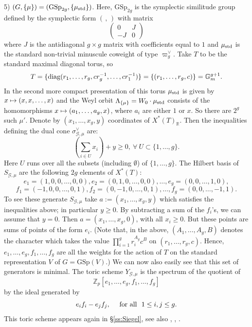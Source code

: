 \documentclass[reqno, 10pt]{amsart}
\makeatletter
\newcommand{\BG}{\ensuremath{\mathbb {G}}\xspace}
\newcommand{\BR}{\ensuremath{\mathbb {R}}\xspace}
\newcommand{\BZ}{\ensuremath{\mathbb {Z}}\xspace}
\newcommand{\CG}{\ensuremath{\mathcal {G}}\xspace}
\newcommand{\GSp}{\mathrm{GSp}}
\theoremstyle{definition}
\numberwithin{equation}{subsection}
\numberwithin{subsubsection}{subsection}
\let\shortmapsto\mapsto
\renewcommand{\mapsto}{%
   \ifbool{@display}{\shortmapsto}{\shortmapsto}%
   }
\makeatother
\begin{document}
 5) $(G,\{\mu\})=(\GSp_{2g}, \{\mu_{\rm std}\})$.  Here, $\GSp_{2g}$ is the symplectic similitude group defined by the symplectic form $(\, ,\,)$ with matrix
 \[
\begin{pmatrix}0 & J\\ -J & 0\end{pmatrix}
\]
where $J$ is the antidiagonal $g\times g$ matrix with coefficients equal to $1$ and $\mu_{\rm std}$ is the standard non-trivial minuscule coweight of type $\varpi_g^\vee$.  Take $T$ to be the standard maximal diagonal torus, so
\[
T=\{{\rm diag}(r_1,\ldots, r_g, cr^{-1}_g,\ldots , cr^{-1}_1)\}=\{(r_1,\ldots, r_g, c)\}=\BG_m^{g+1}.
\]
In the second more compact presentation of this torus   $\mu_{\rm std}$ is given by $x\mapsto (x,x,\ldots, x)$ and the Weyl orbit $\Lambda_{\{\mu\}}=W_0\cdot \mu_{\rm std}$ consists of the homomorphisms  $x\mapsto (a_1,\ldots, a_g, x)$, where $a_i$ are either $1$ or $x$. So there are $2^g$ such $\mu'$. Denote by $(x_1,\ldots, x_g, y)$ coordinates of $X^*(T)_\BR$. Then the inequalities defining the dual cone $\sigma^\vee_{\CG,\mu}$ are:
\begin{equation}\label{ineq}
 (\sum_{i\in U}x_i)+y\geq 0,\ \forall\ U\subset \{1,\ldots ,g\}.
\end{equation}
Here $U$ runs over all the subsets (including $\emptyset$) of $\{1,\ldots ,g\}$. 
The Hilbert basis   of $S_{\CG,\mu}$ are the following $2g$ elements of $X^*(T)$:
\[
e_1=(1,0,0,\ldots, 0,0),  e_2=(0,1,0,\ldots,0,0),\ldots, e_g=(0,0,\ldots, 1,0),
\]
\[
f_1=(-1,0,0,\ldots, 0,1) , f_2=(0,-1,0,\ldots,0,1),\ldots, f_g=(0,0,\ldots, -1,1).
\]
To see these generate $S_{\CG,\mu}$ take $a:=(x_1,\ldots, x_g, y)$ which satisfies the inequalities above; in particular $y\geq 0$. By subtracting a sum  
of the  $f_i$'s, we can assume that $y=0$.
Then $a=(x_1,\ldots, x_g, 0)$, with all $x_i\geq 0$. But these points are sums of points of the form 
 $e_i$.
(Note that, in the above, $(A_1,\ldots, A_g, B)$ denotes the   character which takes the value $\prod_{i=1}^g r_i^{A_g} c^B$ on $(r_1,\ldots, r_g,c)$.
Hence, $e_1,\ldots, e_g,f_1,\ldots, f_g$ 
are all the weights for the action of $T$ on the standard representation $V$ of $G=\GSp(V)$.)
We can now also easily see that this set of generators is minimal.
The  toric scheme $Y_{\CG,\mu}$ is the spectrum of the quotient of 
 \[
 \BZ_p[e_1,\ldots, e_g, f_1,\ldots, f_g]
 \]
 by the ideal generated by 
\[
e_if_i-e_jf_j,\quad\ \hbox{\rm for all}\ \ 1\leq i, j\leq g.
\]
This toric scheme  appears again in  \S \ref{ss:Siegel}, see also \cite{Marazza}, \cite{HS}, \cite{HLS}.
\smallskip
\end{document}

